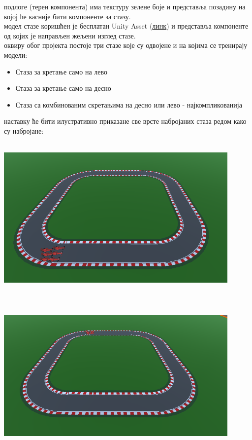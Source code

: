 \documentclass[12pt]{article}
\begin{document}
 подлоге (терен компонента) има текстуру зелене боје и представља позадину на којој ће касније бити компоненте за стазу.\\
 модел стазе коришћен је бесплатан Unity Asset (\href{https://assetstore.unity.com/packages/3d/environments/roadways/modular-lowpoly-track-roads-free-205188}{линк}) и представља компоненте од којих је направљен жељени изглед стазе.\\
 оквиру обог пројекта постоје три стазе које су одвојене и на којима се тренирају модели:
\begin{itemize}
  \item Стаза за кретање само на лево
  \item Стаза за кретање само на десно
  \item Стаза са комбинованим скретањима на десно или лево - најкомпликованија
\end{itemize}
 наставку ће бити илустративно приказане све врсте набројаних стаза редом како су набројане: 

\begin{center}
    \centering 
    \includegraphics[height=8cm, width=12cm]{images/track1}
\end{center}
\vspace{0.5cm}
\begin{center}
    \centering 
    \includegraphics[height=8cm, width=12cm]{images/track2}
\end{center}
\end{document}
